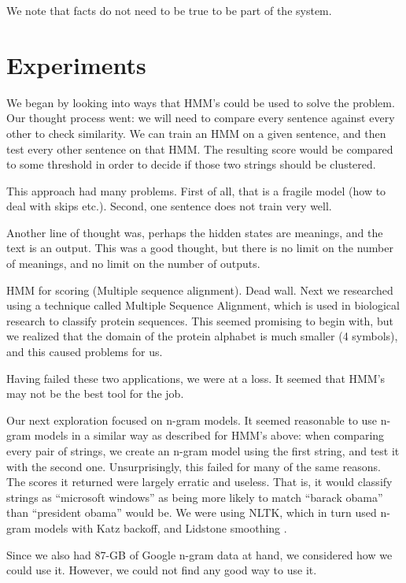 \documentclass{article}
\begin{document}
We note that facts do not need to be true to be part of the system.



\section{Experiments}
We began by looking into ways that HMM's could be used to solve the problem. Our thought process went: we will need to compare every sentence against every other to check similarity. We can train an HMM on a given sentence, and then test every other sentence on that HMM. The resulting score would be compared to some threshold in order to decide if those two strings should be clustered. 

This approach had many problems. First of all, that is a fragile model (how to deal with skips etc.). Second, one sentence does not train very well. 

Another line of thought was, perhaps the hidden states are meanings, and the text is an output. This was a good thought, but there is no limit on the number of meanings, and no limit on the number of outputs. 


HMM for scoring (Multiple sequence alignment). Dead wall.
Next we researched using a technique called Multiple Sequence Alignment, which is used in biological research to classify protein sequences. This seemed promising to begin with, but we realized that the domain of the protein alphabet is much smaller (4 symbols), and this caused problems for us. 

Having failed these two applications, we were at a loss. It seemed that HMM's may not be the best tool for the job.

Our next exploration focused on n-gram models. It seemed reasonable to use n-gram models in a similar way as described for HMM's above: when comparing every pair of strings, we create an n-gram model using the first string, and test it with the second one. Unsurprisingly, this failed for many of the same reasons. The scores it returned were largely erratic and useless. That is, it would classify strings as ``microsoft windows'' as being more likely to match ``barack obama'' than ``president obama'' would be. We were using NLTK, which in turn used n-gram models with Katz backoff, and Lidstone smoothing \cite{nltk}. 

Since we also had 87-GB of Google n-gram data at hand, we considered how we could use it. However, we could not find any good way to use it.
\end{document}
